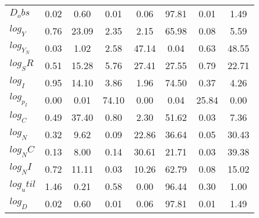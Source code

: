 \begin{center}
\begin{longtable}{lccccccc}
$D_obs     $	 & 	        0.02	 & 	        0.60	 & 	        0.01	 & 	        0.06	 & 	       97.81	 & 	        0.01	 & 	        1.49 \\ 
$log_Y     $	 & 	        0.76	 & 	       23.09	 & 	        2.35	 & 	        2.15	 & 	       65.98	 & 	        0.08	 & 	        5.59 \\ 
$log_Y_N   $	 & 	        0.03	 & 	        1.02	 & 	        2.58	 & 	       47.14	 & 	        0.04	 & 	        0.63	 & 	       48.55 \\ 
$log_SR    $	 & 	        0.51	 & 	       15.28	 & 	        5.76	 & 	       27.41	 & 	       27.55	 & 	        0.79	 & 	       22.71 \\ 
$log_I     $	 & 	        0.95	 & 	       14.10	 & 	        3.86	 & 	        1.96	 & 	       74.50	 & 	        0.37	 & 	        4.26 \\ 
$log_p_I   $	 & 	        0.00	 & 	        0.01	 & 	       74.10	 & 	        0.00	 & 	        0.04	 & 	       25.84	 & 	        0.00 \\ 
$log_C     $	 & 	        0.49	 & 	       37.40	 & 	        0.80	 & 	        2.30	 & 	       51.62	 & 	        0.03	 & 	        7.36 \\ 
$log_N     $	 & 	        0.32	 & 	        9.62	 & 	        0.09	 & 	       22.86	 & 	       36.64	 & 	        0.05	 & 	       30.43 \\ 
$log_NC    $	 & 	        0.13	 & 	        8.00	 & 	        0.14	 & 	       30.61	 & 	       21.71	 & 	        0.03	 & 	       39.38 \\ 
$log_NI    $	 & 	        0.72	 & 	       11.11	 & 	        0.03	 & 	       10.26	 & 	       62.79	 & 	        0.08	 & 	       15.02 \\ 
$log_util  $	 & 	        1.46	 & 	        0.21	 & 	        0.58	 & 	        0.00	 & 	       96.44	 & 	        0.30	 & 	        1.00 \\ 
$log_D     $	 & 	        0.02	 & 	        0.60	 & 	        0.01	 & 	        0.06	 & 	       97.81	 & 	        0.01	 & 	        1.49 \\ 
\end{longtable}
 \end{center}

